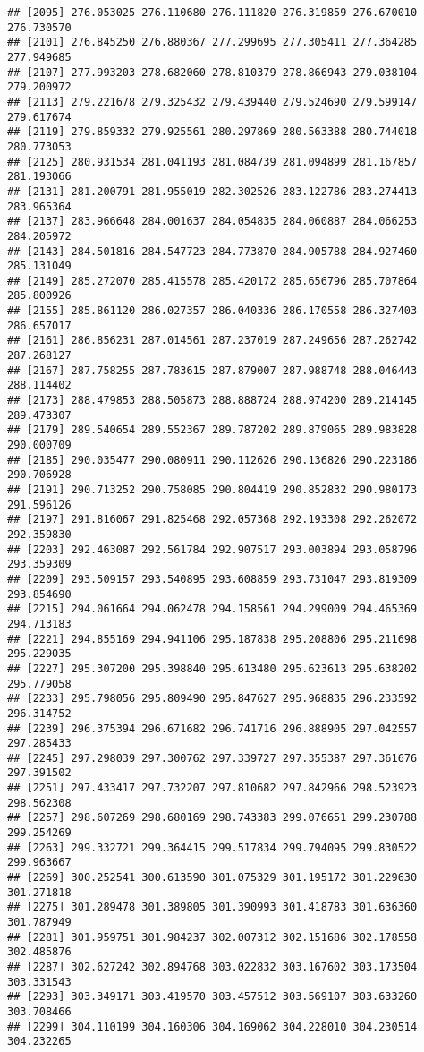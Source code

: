 \documentclass[]{article}
\begin{document}
\begin{verbatim}
## [2095] 276.053025 276.110680 276.111820 276.319859 276.670010 276.730570
## [2101] 276.845250 276.880367 277.299695 277.305411 277.364285 277.949685
## [2107] 277.993203 278.682060 278.810379 278.866943 279.038104 279.200972
## [2113] 279.221678 279.325432 279.439440 279.524690 279.599147 279.617674
## [2119] 279.859332 279.925561 280.297869 280.563388 280.744018 280.773053
## [2125] 280.931534 281.041193 281.084739 281.094899 281.167857 281.193066
## [2131] 281.200791 281.955019 282.302526 283.122786 283.274413 283.965364
## [2137] 283.966648 284.001637 284.054835 284.060887 284.066253 284.205972
## [2143] 284.501816 284.547723 284.773870 284.905788 284.927460 285.131049
## [2149] 285.272070 285.415578 285.420172 285.656796 285.707864 285.800926
## [2155] 285.861120 286.027357 286.040336 286.170558 286.327403 286.657017
## [2161] 286.856231 287.014561 287.237019 287.249656 287.262742 287.268127
## [2167] 287.758255 287.783615 287.879007 287.988748 288.046443 288.114402
## [2173] 288.479853 288.505873 288.888724 288.974200 289.214145 289.473307
## [2179] 289.540654 289.552367 289.787202 289.879065 289.983828 290.000709
## [2185] 290.035477 290.080911 290.112626 290.136826 290.223186 290.706928
## [2191] 290.713252 290.758085 290.804419 290.852832 290.980173 291.596126
## [2197] 291.816067 291.825468 292.057368 292.193308 292.262072 292.359830
## [2203] 292.463087 292.561784 292.907517 293.003894 293.058796 293.359309
## [2209] 293.509157 293.540895 293.608859 293.731047 293.819309 293.854690
## [2215] 294.061664 294.062478 294.158561 294.299009 294.465369 294.713183
## [2221] 294.855169 294.941106 295.187838 295.208806 295.211698 295.229035
## [2227] 295.307200 295.398840 295.613480 295.623613 295.638202 295.779058
## [2233] 295.798056 295.809490 295.847627 295.968835 296.233592 296.314752
## [2239] 296.375394 296.671682 296.741716 296.888905 297.042557 297.285433
## [2245] 297.298039 297.300762 297.339727 297.355387 297.361676 297.391502
## [2251] 297.433417 297.732207 297.810682 297.842966 298.523923 298.562308
## [2257] 298.607269 298.680169 298.743383 299.076651 299.230788 299.254269
## [2263] 299.332721 299.364415 299.517834 299.794095 299.830522 299.963667
## [2269] 300.252541 300.613590 301.075329 301.195172 301.229630 301.271818
## [2275] 301.289478 301.389805 301.390993 301.418783 301.636360 301.787949
## [2281] 301.959751 301.984237 302.007312 302.151686 302.178558 302.485876
## [2287] 302.627242 302.894768 303.022832 303.167602 303.173504 303.331543
## [2293] 303.349171 303.419570 303.457512 303.569107 303.633260 303.708466
## [2299] 304.110199 304.160306 304.169062 304.228010 304.230514 304.232265

\end{verbatim}
\end{document}
